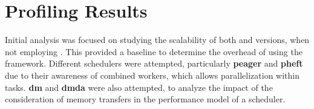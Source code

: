 \documentclass[main.tex]{subfiles}
\begin{document}
\chapter{Profiling Results} \label{chapter:results}


Initial analysis was focused on studying the scalability of both \cpu and \cuda versions, when not employing \starpu. This provided a baseline to determine the overhead of using the framework. Different schedulers were attempted, particularly \textbf{peager} and \textbf{pheft} due to their awareness of combined workers, which allows \openmp parallelization within \cpu tasks. \textbf{dm} and \textbf{dmda} were also attempted, to analyze the impact of the consideration of memory transfers in the performance model of a scheduler.




%


\end{document}
